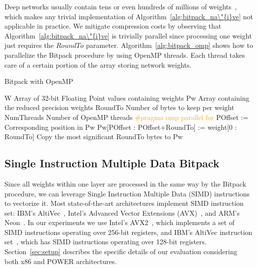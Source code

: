 Deep networks usually contain tens or even hundreds of millions of 
weights~\cite{alexnet, alexnet2, vgg}, which makes any trivial implementation 
of Algorithm~\ref{alg:bitpack_na\"{i}ve} not applicable in practice.
We mitigate compression costs by observing that Algorithm~\ref{alg:bitpack_na\"{i}ve} is trivially parallel since processing one weight just requires the $RoundTo$ parameter.
Algorithm~\ref{alg:bitpack_omp} shows how to parallelize the Bitpack procedure by using OpenMP threads.
Each thread takes care of a certain portion of the array storing network weights.

\begin{algorithm}%
\caption{Bitpack with OpenMP}
\label{alg:bitpack_omp}
{\fontsize{9}{9}\selectfont
\begin{algorithmic}[1]
    \State W 
    \Comment Array of 32-bit Floating Point values containing weights
    \State Pw
    \Comment Array containing the reduced precision weights
    \State RoundTo 
    \Comment Number of bytes to keep per weight 
    \State NumThreads
    \Comment Number of OpenMP threads
    \State \textcolor{orange} {\#pragma omp parallel for} %
            \State POffset := Corresponding position in Pw
            \State Pw[POffset : POffset+RoundTo] := weight[0 : RoundTo]
            \Comment Copy the most significant RoundTo bytes to Pw
      \EndFor
\end{algorithmic}
}
\end{algorithm}

\subsection{Single Instruction Multiple Data Bitpack}
Since all weights within one layer are processed in the same way by the Bitpack procedure, we can leverage Single Instruction Multiple Data (SIMD) instructions to vectorize it.
Most state-of-the-art architectures implement SIMD instruction set: IBM's 
AltiVec~\cite{Altivec}, Intel's Advanced Vector Extensions (AVX)~\cite{avx}, and ARM's Neon~\cite{neon}.
In our experiments we use
Intel's AVX2~\cite{avx}, which implements a set of SIMD 
instructions operating over 256-bit registers, and IBM's AltiVec instruction 
set~\cite{Altivec}, which has SIMD instructions operating over 128-bit registers.
Section~\ref{sec:setup} describes the specific details of our evaluation considering both x86 and POWER architectures.

